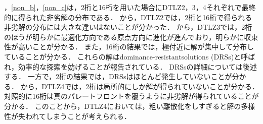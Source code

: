 \documentclass[../main/main]{subfiles}
\begin{document}
\begin{description}
\quad {}，\ref{non_b}，\ref{non_c}は，2桁と16桁を用いた場合にDTLZ2，3，4それぞれで最終的に得られた非劣解の分布である．
から，DTLZ2では，2桁と16桁で得られる非劣解の分布には大きな違いはないことが分かった．
から，DTLZ3では，2桁のほうが明らかに最適化方向である原点方向に進化が進んでおり，明らかに収束性が高いことが分かる．
また，16桁の結果では，極付近に解が集中して分布していることが分かる．
これらの解はdominance-resistantsolutions (DRSs)\cite{Ikeda2001Failure}と呼ばれ，効率的な探索を妨げることが報告されている．
DRSsの詳細については後述する．
一方で，2桁の結果では，DRSsはほとんど発生していないことが分かる．
から，DTLZ4では，2桁は局所的にしか解が得られていないことが分かる．
対照的に16桁は真のパレートフロントを覆うように非劣解が得られていることが分かる．
このことから，DTLZ4においては，粗い離散化をしすぎると解の多様性が失われてしまうことが考えられる．





\end{description}
\end{document}
